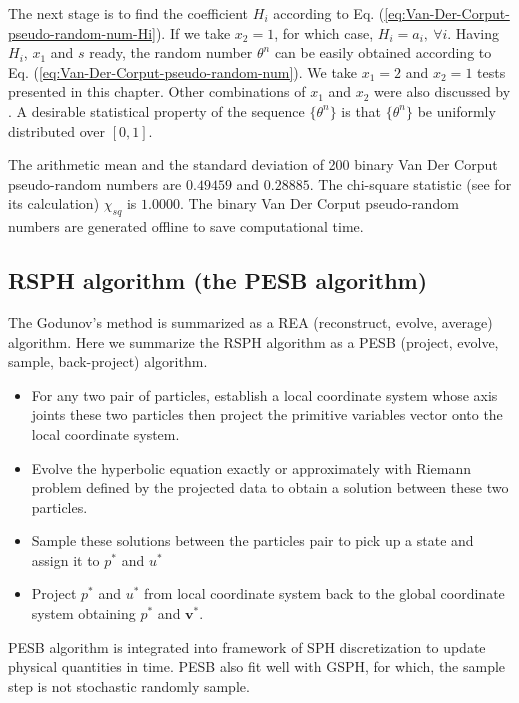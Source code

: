 The next stage is to find the coefficient $H_i$ according to Eq. (\ref{eq:Van-Der-Corput-pseudo-random-num-Hi}). If we take $x_2 = 1$, for which case, $H_i = a_i, \ \forall i$. Having $H_i$, $x_1$ and $s$ ready, the random number $\theta ^n $ can be easily obtained according to Eq. (\ref{eq:Van-Der-Corput-pseudo-random-num}).
We take $x_1=2$  and $x_2 =1$ tests presented in this chapter. Other combinations of $x_1$ and $x_2$ were also discussed by \citet{toro2013riemann}. A desirable statistical property of the sequence $\{\theta ^n\}$ is that $\{\theta ^n\}$ be uniformly distributed over $[0,1]$.
 
The arithmetic mean and the standard deviation of 200 binary Van Der Corput pseudo-random numbers are $0.49459$ and $0.28885$. The chi-square statistic (see \citet{toro2013riemann} for its calculation) $\chi_{sq}$ is $1.0000$. 
The binary Van Der Corput pseudo-random numbers are generated offline to save computational time.


\subsection{RSPH algorithm (the PESB algorithm)}
The Godunov's method is summarized as a REA (reconstruct, evolve, average) algorithm. Here we summarize the RSPH algorithm as a PESB (project, evolve, sample, back-project) algorithm. 
\begin{itemize}
\item For any two pair of particles, establish a local coordinate system whose axis joints these two particles then project the primitive variables vector onto the local coordinate system.
\item Evolve the hyperbolic equation exactly or approximately with Riemann problem defined by the projected data to obtain a solution between these two particles.
\item Sample these solutions between the particles pair to pick up a state and assign it to $p^{\ast}$ and $u^{\ast}$
\item Project $p^{\ast}$ and $u^{\ast}$ from local coordinate system back to the global coordinate system obtaining $p^{\ast}$ and $\textbf{v}^{\ast}$.
\end{itemize}
PESB algorithm is integrated into framework of SPH discretization to update physical quantities in time. PESB also fit well with GSPH, for which, the sample step is not stochastic randomly sample.

